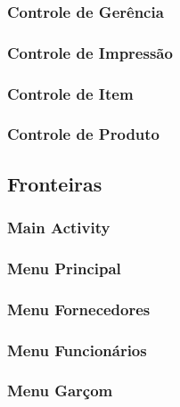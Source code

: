 \subsubsection{Controle de Gerência}

\subsubsection{Controle de Impressão}

\subsubsection{Controle de Item}

\subsubsection{Controle de Produto}


\subsection{Fronteiras}

\subsubsection{Main Activity}

\subsubsection{Menu Principal}

\subsubsection{Menu Fornecedores}

\subsubsection{Menu Funcionários}

\subsubsection{Menu Garçom}

